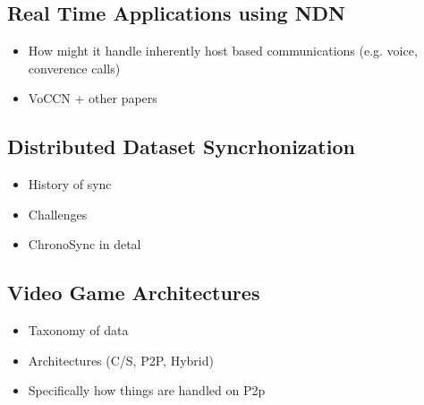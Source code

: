 \subsection{Real Time Applications using NDN}
\begin{itemize}
    \item How might it handle inherently host based communications (e.g. voice, converence calls)
    \item VoCCN + other papers
\end{itemize}

\subsection{Distributed Dataset Syncrhonization}
\begin{itemize}
    \item History of sync
    \item Challenges
    \item ChronoSync in detal
\end{itemize}

\subsection{Video Game Architectures}
\begin{itemize}
    \item Taxonomy of data
    \item Architectures (C/S, P2P, Hybrid)
    \item Specifically how things are handled on P2p
\end{itemize}

